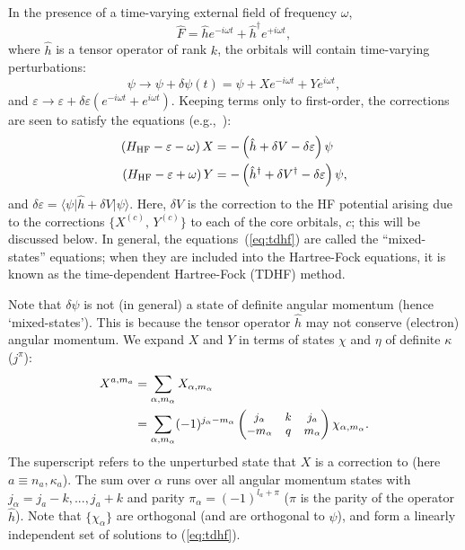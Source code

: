 \documentclass[10pt,twocolumn,a4paper]{article}%
\newcommand{\bra}[1]{\ensuremath{\langle #1|}}	%
\newcommand{\ket}[1]{\ensuremath{|#1\rangle}}	%
\newcommand{\threej}[6]{\small\ensuremath{\begin{pmatrix}#1&#2&#3\\#4&#5&#6\end{pmatrix}}}	%
\newcommand{\be}{\begin{equation}}
\newcommand{\ee}{\end{equation}}
\def\en{\ensuremath{\varepsilon}}
\renewcommand{\a}{\ensuremath{\alpha}}
\renewcommand{\k}{\ensuremath{\kappa}}
\newcommand{\w}{\ensuremath{\omega}}
\begin{document}
In the presence of a time-varying external field of frequency $\omega$,
\be
\hat F = \hat h e^{-i\w t} +  \hat h^\dag e^{+i\w t} ,
\ee
where $\hat h$ is a tensor operator of rank $k$, 
 the orbitals will contain time-varying perturbations:
\be\label{eq:tdhf-dPsi}
\psi \to \psi + \delta\psi(t) = \psi +  X e^{- i\w t}+ Y e^{ i\w t},
\ee
and $\en\to\en+\delta\en (e^{- i\w t}+ e^{ i\w t})$.
Keeping terms only to first-order, the corrections are seen to satisfy the equations (e.g.,~\cite{DzubaHFS1984}):
\begin{equation}\begin{split}
\label{eq:tdhf}
\left( H_{\rm HF} - \en -\w \right)X &= -\left(\hat h + \delta V - \delta \en \right)\psi \\
\left( H_{\rm HF} - \en +\w \right)Y &= -\left(\hat h^\dag + \delta V^\dag - \delta \en \right)\psi ,
\end{split}\end{equation}
and $\delta\en = \bra{\psi}\hat h + \delta V\ket{\psi}$.
%
Here, $\delta V$ is the correction to the HF potential arising due to the corrections $\{X^{(c)},\,Y^{(c)}\}$ to each of the core orbitals, $c$; this will be discussed below.
In general, the equations~(\ref{eq:tdhf}) are called the ``mixed-states'' equations; when they are included into the Hartree-Fock equations, it is known as the time-dependent Hartree-Fock (TDHF) method.

Note that $\delta\psi$ is not (in general) a state of definite angular momentum (hence `mixed-states').
This is because the tensor operator $\hat h$ may not conserve (electron) angular momentum.
We expand $X$ and $Y$ in terms of states $\chi$ and $\eta$ of definite $\k$ ($j^\pi$):
\begin{equation}\begin{split}
\label{eq:dPsi-pw}
X^{a,m_a} &= \sum_{\a,m_\a} X_{\a,m_\a}\\
 &= \sum_{\a,m_\a}(-1)^{j_\a-m_\a}\threej{j_\a}{k}{j_a}{-m_\a}{q}{m_\a}\chi_{\a, m_\a}.
\end{split}\end{equation}
The superscript refers to the unperturbed state that $X$ is a correction to (here $a\equiv n_a,\k_a$).
The sum over $\alpha$ runs over all angular momentum states with $j_\alpha = j_a - k, ..., j_a+k$ and parity $\pi_\alpha = (-1)^{l_a + \pi}$ ($\pi$ is the parity of the operator $\hat h$).
Note that $\{\chi_\a\}$ are orthogonal (and are orthogonal to $\psi$), and form a linearly independent set of solutions to (\ref{eq:tdhf}).
\end{document}
